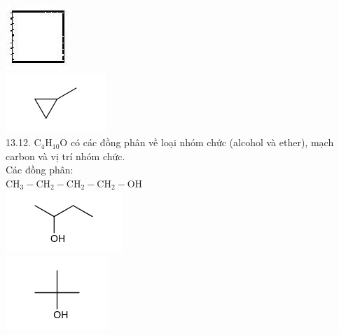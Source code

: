 \documentclass[10pt]{article}
\begin{document}
\includegraphics[max width=\textwidth, center]{2025_10_23_ed7118e3280f74e91193g-21}\\
\includegraphics{smile-46a9fecad658203382dd7bf14930aef48e7c6a34}\\
13.12. $\mathrm{C}_{4} \mathrm{H}_{10} \mathrm{O}$ có các đồng phân về loại nhóm chức (alcohol và ether), mạch carbon và vị trí nhóm chức.\\
Các đồng phân:\\
$\mathrm{CH}_{3}-\mathrm{CH}_{2}-\mathrm{CH}_{2}-\mathrm{CH}_{2}-\mathrm{OH}$\\
\includegraphics{smile-e3cd5a943d2077ded51796bb95b17b0be837e8b2}\\
\includegraphics{smile-c6a305275eec148796f60ddf4d287a92f1ef034a}\\
\end{document}

